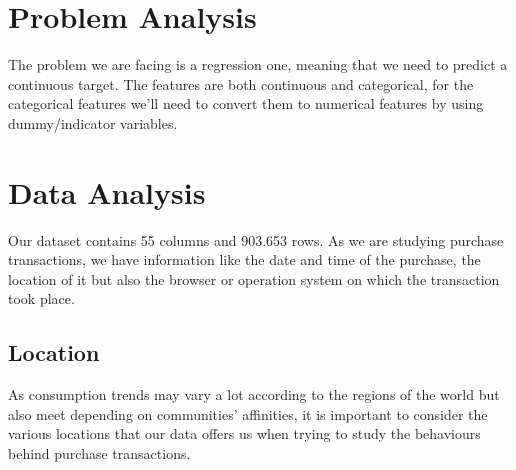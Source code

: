 \documentclass[a4paper, 12pt, one column]{article}
\begin{document}


\newpage

\section{Problem Analysis}

The problem we are facing is a regression one, meaning that we need to predict a continuous target. The features are both continuous and categorical, for the categorical features we'll need to convert them to numerical features by using dummy/indicator variables. 

\newpage

\section{Data Analysis}

Our dataset contains 55 columns and 903.653 rows. As we are studying purchase  
transactions, we have information like the date and time of the purchase, the location of it but also the browser or operation system on which the transaction took place. 

\subsection{Location}
As consumption trends may vary a lot according to the regions of the world but also meet depending on communities' affinities, it is important to consider the various locations that our data offers us when trying to study the behaviours behind purchase transactions.
\end{document}
